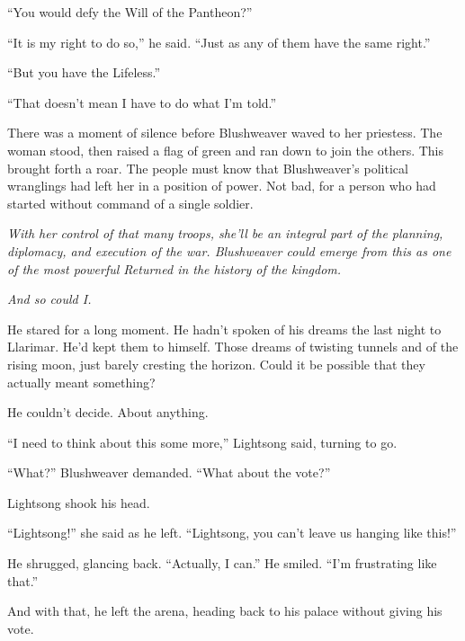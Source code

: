 “You would defy the Will of the Pantheon?”

“It is my right to do so,” he said. “Just as any of them have the same right.”

“But you have the Lifeless.”

“That doesn’t mean I have to do what I’m told.”

There was a moment of silence before Blushweaver waved to her priestess. The woman stood, then raised a flag of green and ran down to join the others. This brought forth a roar. The people must know that Blushweaver’s political wranglings had left her in a position of power. Not bad, for a person who had started without command of a single soldier.

\textit{With her control of that many troops, she’ll be an integral part of the planning, diplomacy, and execution of the war. Blushweaver could emerge from this as one of the most powerful Returned in the history of the kingdom.}

\textit{And so could I.}

He stared for a long moment. He hadn’t spoken of his dreams the last night to Llarimar. He’d kept them to himself. Those dreams of twisting tunnels and of the rising moon, just barely cresting the horizon. Could it be possible that they actually meant something?

He couldn’t decide. About anything.

“I need to think about this some more,” Lightsong said, turning to go.

“What?” Blushweaver demanded. “What about the vote?”

Lightsong shook his head.

“Lightsong!” she said as he left. “Lightsong, you can’t leave us hanging like this!”

He shrugged, glancing back. “Actually, I can.” He smiled. “I’m frustrating like that.”

And with that, he left the arena, heading back to his palace without giving his vote.

